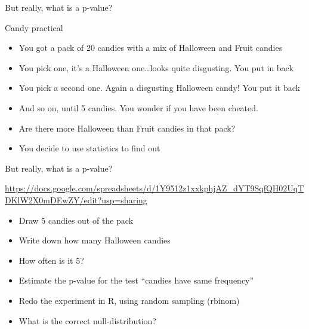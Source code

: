 \documentclass[10pt]{beamer}
\begin{document}
\begin{frame}{But really, what is a p-value?}

 \begin{block}{Candy practical}
 \begin{itemize}[<+->]
  \item You got a pack of 20 candies with a mix of Halloween and Fruit candies
  \item You pick one, it's a Halloween one\dots looks quite disgusting. You put in back
  \item You pick a second one. Again a disgusting Halloween candy! You put it back
  \item And so on, until 5 candies. You wonder if you have been cheated.
  \item Are there more Halloween than Fruit candies in that pack?
  \item You decide to use statistics to find out
 \end{itemize}
 \end{block}

\end{frame}

\begin{frame}{But really, what is a p-value?}

\url{https://docs.google.com/spreadsheets/d/1Y9512z1xxkphjAZ_dYT9SqfQH02UqTDKlW2X0mDEwZY/edit?usp=sharing}

 \begin{exampleblock}{}
  \begin{itemize}
   \item Draw 5 candies out of the pack
   \item Write down how many Halloween candies
   \item How often is it 5?
   \pause
   \item Estimate the p-value for the test ``candies have same frequency''
   \pause
   \item Redo the experiment in R, using random sampling (rbinom)
   \pause
   \item What is the correct null-distribution?
  \end{itemize}
 \end{exampleblock}
  
\end{frame}
\end{document}
